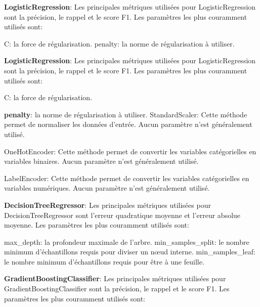 \begin{DoxyEnumerate}
\item {\bfseries Logistic\+Regression}\+: Les principales métriques utilisées pour Logistic\+Regression sont la précision, le rappel et le score F1. Les paramètres les plus couramment utilisés sont\+:
\end{DoxyEnumerate}

C\+: la force de régularisation. penalty\+: la norme de régularisation à utiliser.


\begin{DoxyEnumerate}
\item {\bfseries Logistic\+Regression}\+: Les principales métriques utilisées pour Logistic\+Regression sont la précision, le rappel et le score F1. Les paramètres les plus couramment utilisés sont\+:
\end{DoxyEnumerate}

C\+: la force de régularisation.


\begin{DoxyEnumerate}
\item {\bfseries penalty}\+: la norme de régularisation à utiliser. Standard\+Scaler\+: Cette méthode permet de normaliser les données d’entrée. Aucun paramètre n’est généralement utilisé.
\end{DoxyEnumerate}

One\+Hot\+Encoder\+: Cette méthode permet de convertir les variables catégorielles en variables binaires. Aucun paramètre n’est généralement utilisé.

Label\+Encoder\+: Cette méthode permet de convertir les variables catégorielles en variables numériques. Aucun paramètre n’est généralement utilisé.


\begin{DoxyEnumerate}
\item {\bfseries Decision\+Tree\+Regressor}\+: Les principales métriques utilisées pour Decision\+Tree\+Regressor sont l’erreur quadratique moyenne et l’erreur absolue moyenne. Les paramètres les plus couramment utilisés sont\+:
\end{DoxyEnumerate}

max\+\_\+depth\+: la profondeur maximale de l’arbre. min\+\_\+samples\+\_\+split\+: le nombre minimum d’échantillons requis pour diviser un nœud interne. min\+\_\+samples\+\_\+leaf\+: le nombre minimum d’échantillons requis pour être à une feuille.


\begin{DoxyEnumerate}
\item {\bfseries Gradient\+Boosting\+Classifier}\+: Les principales métriques utilisées pour Gradient\+Boosting\+Classifier sont la précision, le rappel et le score F1. Les paramètres les plus couramment utilisés sont\+:
\end{DoxyEnumerate}

